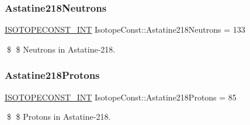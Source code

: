 \subsubsection{\texorpdfstring{Astatine218\+Neutrons}{Astatine218Neutrons}}
{\footnotesize\ttfamily \mbox{\hyperlink{group___isotope_const-_macros_ga5f18360b3e99483a35c32d789e62621c}{I\+S\+O\+T\+O\+P\+E\+C\+O\+N\+S\+T\+\_\+\+I\+NT}} Isotope\+Const\+::\+Astatine218\+Neutrons = 133}

\$ \$ Neutrons in Astatine-\/218. \mbox{\label{group___isotope_const-_astatine-_at218_ga4a7126772c78666dcb5000b5777b4bb6}} 
\subsubsection{\texorpdfstring{Astatine218\+Protons}{Astatine218Protons}}
{\footnotesize\ttfamily \mbox{\hyperlink{group___isotope_const-_macros_ga5f18360b3e99483a35c32d789e62621c}{I\+S\+O\+T\+O\+P\+E\+C\+O\+N\+S\+T\+\_\+\+I\+NT}} Isotope\+Const\+::\+Astatine218\+Protons = 85}

\$ \$ Protons in Astatine-\/218. 